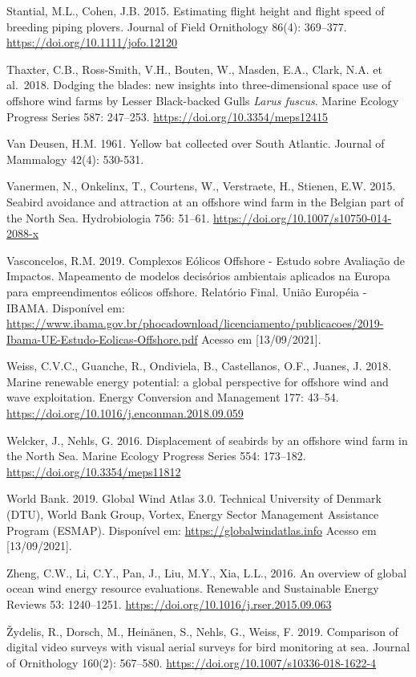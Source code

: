 \documentclass[
  oneside]{scrbook}
\begin{document}
Stantial, M.L., Cohen, J.B. 2015. Estimating flight height and flight speed of breeding piping plovers. Journal of Field Ornithology 86(4): 369--377. \url{https://doi.org/10.1111/jofo.12120}

Thaxter, C.B., Ross-Smith, V.H., Bouten, W., Masden, E.A., Clark, N.A. et al.~2018. Dodging the blades: new insights into three-dimensional space use of offshore wind farms by Lesser Black-backed Gulls \emph{Larus fuscus}. Marine Ecology Progress Series 587: 247--253. \url{https://doi.org/10.3354/meps12415}

Van Deusen, H.M. 1961. Yellow bat collected over South Atlantic. Journal of Mammalogy 42(4): 530-531.

Vanermen, N., Onkelinx, T., Courtens, W., Verstraete, H., Stienen, E.W. 2015. Seabird avoidance and attraction at an offshore wind farm in the Belgian part of the North Sea. Hydrobiologia 756: 51--61. \url{https://doi.org/10.1007/s10750-014-2088-x}

Vasconcelos, R.M. 2019. Complexos Eólicos Offshore - Estudo sobre Avaliação de Impactos. Mapeamento de modelos decisórios ambientais aplicados na Europa para empreendimentos eólicos offshore. Relatório Final. União Européia - IBAMA. Disponível em: \url{https://www.ibama.gov.br/phocadownload/licenciamento/publicacoes/2019-Ibama-UE-Estudo-Eolicas-Offshore.pdf} Acesso em {[}13/09/2021{]}.

Weiss, C.V.C., Guanche, R., Ondiviela, B., Castellanos, O.F., Juanes, J. 2018. Marine renewable energy potential: a global perspective for offshore wind and wave exploitation. Energy Conversion and Management 177: 43--54. \url{https://doi.org/10.1016/j.enconman.2018.09.059}

Welcker, J., Nehls, G. 2016. Displacement of seabirds by an offshore wind farm in the North Sea. Marine Ecology Progress Series 554: 173--182. \url{https://doi.org/10.3354/meps11812}

World Bank. 2019. Global Wind Atlas 3.0. Technical University of Denmark (DTU), World Bank Group, Vortex, Energy Sector Management Assistance Program (ESMAP). Disponível em: \url{https://globalwindatlas.info} Acesso em {[}13/09/2021{]}.

Zheng, C.W., Li, C.Y., Pan, J., Liu, M.Y., Xia, L.L., 2016. An overview of global ocean wind energy resource evaluations. Renewable and Sustainable Energy Reviews 53: 1240--1251. \url{https://doi.org/10.1016/j.rser.2015.09.063}

Žydelis, R., Dorsch, M., Heinänen, S., Nehls, G., Weiss, F. 2019. Comparison of digital video surveys with visual aerial surveys for bird monitoring at sea. Journal of Ornithology 160(2): 567--580. \url{https://doi.org/10.1007/s10336-018-1622-4}
\end{document}
